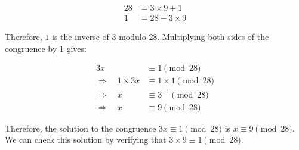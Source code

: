 \documentclass[12pt,openany]{book}
\theoremstyle{definition}
\begin{document}
\begin{align*}
	28 &= 3\times 9 + 1 \\
	1 &= 28 - 3\times 9
\end{align*}

Therefore, $1$ is the inverse of $3$ modulo $28$. Multiplying both sides of the congruence by $1$ gives:

\begin{align*}
	3x &\equiv 1\pmod{28} \\
	\Rightarrow \quad 1\times 3x &\equiv 1\times 1\pmod{28} \\
	\Rightarrow \quad x &\equiv 3^{-1}\pmod{28} \\
	\Rightarrow \quad x &\equiv 9\pmod{28}
\end{align*}

Therefore, the solution to the congruence $3x\equiv 1\pmod{28}$ is $x\equiv 9\pmod{28}$. We can check this solution by verifying that $3\times 9\equiv 1\pmod{28}$.

\end{document}
